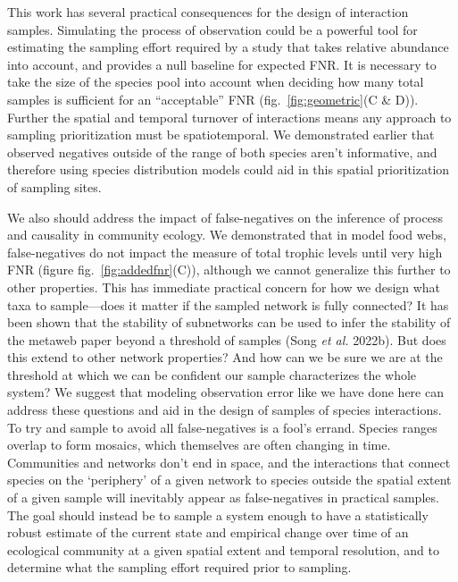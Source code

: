 \documentclass[10pt,oneside]{article}
\begin{document}
This work has several practical consequences for the design of
interaction samples. Simulating the process of observation could be a
powerful tool for estimating the sampling effort required by a study
that takes relative abundance into account, and provides a null baseline
for expected FNR. It is necessary to take the size of the species pool
into account when deciding how many total samples is sufficient for an
``acceptable'' FNR (fig.~\ref{fig:geometric}(C \& D)). Further the
spatial and temporal turnover of interactions means any approach to
sampling prioritization must be spatiotemporal. We demonstrated earlier
that observed negatives outside of the range of both species aren't
informative, and therefore using species distribution models could aid
in this spatial prioritization of sampling sites.

We also should address the impact of false-negatives on the inference of
process and causality in community ecology. We demonstrated that in
model food webs, false-negatives do not impact the measure of total
trophic levels until very high FNR (figure fig.~\ref{fig:addedfnr}(C)),
although we cannot generalize this further to other properties. This has
immediate practical concern for how we design what taxa to sample---does
it matter if the sampled network is fully connected? It has been shown
that the stability of subnetworks can be used to infer the stability of
the metaweb paper beyond a threshold of samples (Song \emph{et al.}
2022b). But does this extend to other network properties? And how can we
be sure we are at the threshold at which we can be confident our sample
characterizes the whole system? We suggest that modeling observation
error like we have done here can address these questions and aid in the
design of samples of species interactions. To try and sample to avoid
all false-negatives is a fool's errand. Species ranges overlap to form
mosaics, which themselves are often changing in time. Communities and
networks don't end in space, and the interactions that connect species
on the `periphery' of a given network to species outside the spatial
extent of a given sample will inevitably appear as false-negatives in
practical samples. The goal should instead be to sample a system enough
to have a statistically robust estimate of the current state and
empirical change over time of an ecological community at a given spatial
extent and temporal resolution, and to determine what the sampling
effort required prior to sampling.
\end{document}

